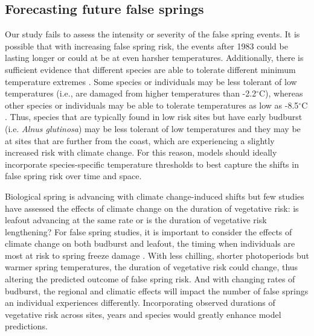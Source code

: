 \documentclass{article}\usepackage[]{graphicx}\usepackage[]{color}
\begin{document}
\subsection*{Forecasting future false springs}
Our study fails to assess the intensity or severity of the false spring events. It is possible that with increasing false spring risk, the events after 1983 could be lasting longer or could at be at even harsher temperatures. Additionally, there is sufficient evidence that different species are able to tolerate different minimum temperature extremes \citep{Lenz2013, Korner2016, Zhuo2018}. Some species or individuals may be less tolerant of low temperatures (i.e., are damaged from higher temperatures than -2.2$^{\circ}$C), whereas other species or individuals may be able to tolerate temperatures as low as -8.5$^{\circ}$C \citep{Lenz2016}. Thus, species that are typically found in low risk sites but have early budburst (i.e. \textit{Alnus glutinosa}) may be less tolerant of low temperatures and they may be at sites that are further from the coast, which are experiencing a slightly increased risk with climate change. For this reason, models should ideally incorporate species-specific temperature thresholds to best capture the shifts in false spring risk over time and space. 

Biological spring is advancing with climate change-induced shifts but few studies have assessed the effects of climate change on the duration of vegetative risk: is leafout advancing at the same rate or is the duration of vegetative risk lengthening? For false spring studies, it is important to consider the effects of climate change on both budburst and leafout, the timing when individuals are most at risk to spring freeze damage \citep{Lenz2016}. With less chilling, shorter photoperiods but warmer spring temperatures, the duration of vegetative risk could change, thus altering the predicted outcome of false spring risk. And with changing rates of budburst, the regional and climatic effects will impact the number of false springs an individual experiences differently. Incorporating observed durations of vegetative risk across sites, years and species would greatly enhance model predictions. 

  
\end{document}
